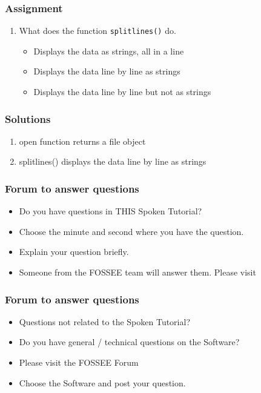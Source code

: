 \documentclass[17pt]{beamer}
\newcounter{saveenumi}
\newcommand{\conti}{\setcounter{enumi}{\value{saveenumi}}}
\begin{document}
\begin{frame}
\frametitle{Assignment}
\label{sec-7.2}
\begin{enumerate}
\conti
\item What does the function \texttt{splitlines()} do.
\begin{itemize}
\item Displays the data as strings, all in a line
\item Displays the data line by line as strings
\item Displays the data line by line but not as strings
\end{itemize}
\end{enumerate}
\end{frame}
\begin{frame}
\frametitle{Solutions}
\label{sec-8}
\begin{enumerate}
\item open function returns a file object
\vspace{10pt}
\item splitlines() displays the data line by line as strings
\end{enumerate}
\end{frame}
\begin{frame}
\frametitle{Forum to answer questions}
\begin{itemize}
\item Do you have questions in THIS Spoken Tutorial?
\item Choose the minute and second where you have the question.
\item Explain your question briefly.
\item Someone from the FOSSEE team will answer them. Please visit 
\end{itemize}
\begin{center}
{\color{blue}{http://forums.spoken-tutorial.org/}}
 \end{center} 
\end{frame}
\begin{frame}
\frametitle{Forum to answer questions}
\begin{itemize}
\item Questions not related to the Spoken Tutorial?
\item Do you have general / technical questions on the Software?
\item Please visit the FOSSEE Forum
\begin{center}
{\color{blue}{http://forums.fossee.in/}}
 \end{center}
\item Choose the Software and post your question.
\end{itemize}
\end{frame}
\end{document}
